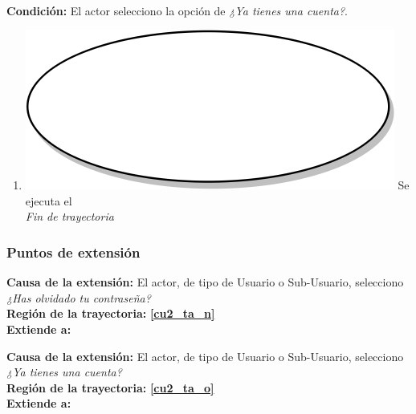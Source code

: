 \textbf{}\\
\textbf{Condición:} El actor selecciono la opción de \textit{¿Ya tienes una cuenta?}.\\
 \begin{enumerate}[label=O\arabic*]
    \item {\includegraphics[scale=.05]{Capitulo3/img/proceso.png} Se ejecuta el }\\
    \textit{Fin de trayectoria} \\
\end{enumerate}

\subsubsection{Puntos de extensión}
\noindent \textbf{Causa de la extensión:} El actor, de tipo de Usuario o Sub-Usuario, selecciono \textit{¿Has olvidado tu contraseña?} \\
\textbf{Región de la trayectoria:} \textbf{\ref{cu2_ta_n}} \\
\textbf{Extiende a:}  \\ \par

\noindent \textbf{Causa de la extensión:} El actor, de tipo de Usuario o Sub-Usuario, selecciono \textit{¿Ya tienes una cuenta?} \\
\textbf{Región de la trayectoria:} \textbf{\ref{cu2_ta_o}} \\
\textbf{Extiende a:} 
